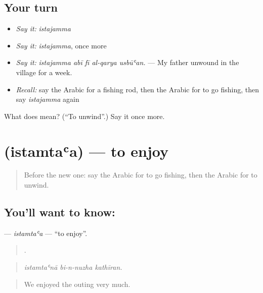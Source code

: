 \subsection*{Your turn}
\begin{itemize}
\raggedright
  \item \emph{Say it:} \emph{istajamma}
  \item \emph{Say it:} \emph{istajamma}, once more
  \item \emph{Say it:} \emph{istajamma abī fī al-qarya usbūʿan.} — My father unwound in the village for a week.
  \item \emph{Recall:} say the Arabic for a fishing rod, then the Arabic for to go fishing, then say \emph{istajamma} again
\end{itemize}

\begin{tcolorbox}[breakable,colback=teal!4,colframe=teal!35!black,title={Before you move on}]
What does  mean? (\textquotedblleft{}To unwind\textquotedblright{}.) Say it once more.
\end{tcolorbox}
\section[\texorpdfstring{\ar{استمتع} (istamtaʿa)}{استمتع (istamtaʿa)}]{ (istamtaʿa) — to enjoy}

\label{lesson:AR-C536-istamtaa}



\begin{quote}
Before the new one: say the Arabic for to go fishing, then the Arabic for to unwind.
\end{quote}

\subsection*{You'll want to know: }
\textbf{} — \emph{istamtaʿa} — \textquotedblleft{}to enjoy\textquotedblright{}.

\begin{quote}
  .
\end{quote}

\begin{quote}
\emph{istamtaʿnā bi-n-nuzha kathīran.}
\end{quote}

\begin{quote}
We enjoyed the outing very much.
\end{quote}

